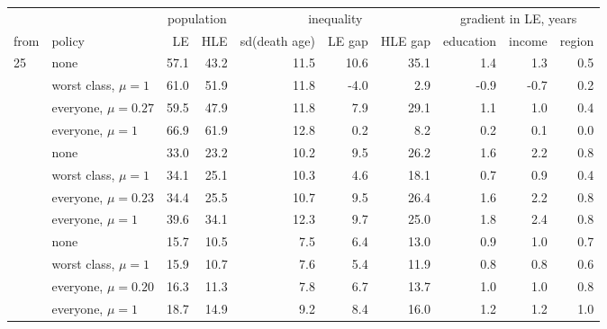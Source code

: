 \begin{tabular}{llrrrrrrrr}
\toprule
 & & \multicolumn{2}{c}{population} & \multicolumn{3}{c}{inequality} & \multicolumn{3}{c}{gradient in LE, years} \\
\cmidrule(lr){3-4} \cmidrule(lr){5-7} \cmidrule(lr){8-10}
from & policy & LE & HLE & sd(death age) & LE gap & HLE gap & education & income & region \\
\midrule
25 & none & 57.1 & 43.2 & 11.5 & 10.6 & 35.1 & 1.4 & 1.3 & 0.5 \\
 & worst class, $\mu=1$ & 61.0 & 51.9 & 11.8 & -4.0 & 2.9 & -0.9 & -0.7 & 0.2 \\
 & everyone, $\mu=0.27$ & 59.5 & 47.9 & 11.8 & 7.9 & 29.1 & 1.1 & 1.0 & 0.4 \\
 & everyone, $\mu=1$ & 66.9 & 61.9 & 12.8 & 0.2 & 8.2 & 0.2 & 0.1 & 0.0 \\
\addlinespace
50 & none & 33.0 & 23.2 & 10.2 & 9.5 & 26.2 & 1.6 & 2.2 & 0.8 \\
 & worst class, $\mu=1$ & 34.1 & 25.1 & 10.3 & 4.6 & 18.1 & 0.7 & 0.9 & 0.4 \\
 & everyone, $\mu=0.23$ & 34.4 & 25.5 & 10.7 & 9.5 & 26.4 & 1.6 & 2.2 & 0.8 \\
 & everyone, $\mu=1$ & 39.6 & 34.1 & 12.3 & 9.7 & 25.0 & 1.8 & 2.4 & 0.8 \\
\addlinespace
70 & none & 15.7 & 10.5 & 7.5 & 6.4 & 13.0 & 0.9 & 1.0 & 0.7 \\
 & worst class, $\mu=1$ & 15.9 & 10.7 & 7.6 & 5.4 & 11.9 & 0.8 & 0.8 & 0.6 \\
 & everyone, $\mu=0.20$ & 16.3 & 11.3 & 7.8 & 6.7 & 13.7 & 1.0 & 1.0 & 0.8 \\
 & everyone, $\mu=1$ & 18.7 & 14.9 & 9.2 & 8.4 & 16.0 & 1.2 & 1.2 & 1.0 \\
\bottomrule
\end{tabular}
